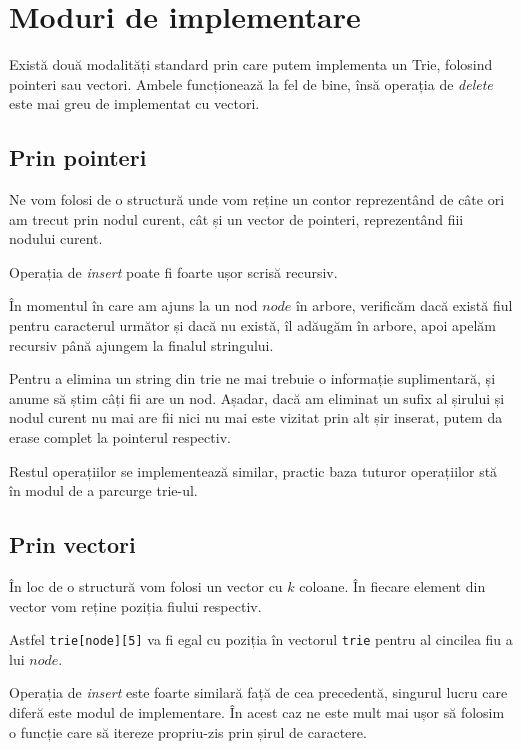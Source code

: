 \section{Moduri de implementare}
Există două modalități standard prin care putem implementa un Trie, folosind pointeri sau vectori. Ambele funcționează la fel de bine, însă operația de \textit{delete} este mai greu de implementat cu vectori.

\subsection{Prin pointeri}
Ne vom folosi de o structură unde vom reține un contor reprezentând de câte ori am trecut prin nodul curent, cât și un vector de pointeri, reprezentând fiii nodului curent.

Operația de \textit{insert} poate fi foarte ușor scrisă recursiv.

În momentul în care am ajuns la un nod $node$ în arbore, verificăm dacă există fiul pentru caracterul următor și dacă nu există, îl adăugăm în arbore, apoi apelăm recursiv până ajungem la finalul stringului. 

Pentru a elimina un string din trie ne mai trebuie o informație suplimentară, și anume să știm câți fii are un nod. Așadar, dacă am eliminat un sufix al șirului și nodul curent nu mai are fii nici nu mai este vizitat prin alt șir inserat, putem da erase complet la pointerul respectiv. 

Restul operațiilor se implementează similar, practic baza tuturor operațiilor stă în modul de a parcurge trie-ul.

\subsection{Prin vectori}
În loc de o structură vom folosi un vector cu $k$ coloane. În fiecare element din vector vom reține poziția fiului respectiv.

Astfel \texttt{trie[node][5]} va fi egal cu poziția în vectorul \texttt{trie} pentru al cincilea fiu a lui $node$.

Operația de \textit{insert} este foarte similară față de cea precedentă, singurul lucru care diferă este modul de implementare. În acest caz ne este mult mai ușor să folosim o funcție care să itereze propriu-zis prin șirul de caractere.

